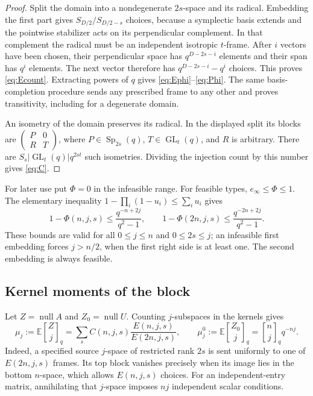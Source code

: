 \documentclass[11pt]{article}
\theoremstyle{definition}\newtheorem{definition}[theorem]{Definition}
\theoremstyle{remark}\newtheorem{remark}[theorem]{Remark}
\newcommand{\E}{\mathbb E}
\newcommand{\Sp}{\operatorname{Sp}}
\newcommand{\GL}{\operatorname{GL}}
\newcommand{\nul}{\operatorname{null}}
\newcommand{\gb}[2]{\genfrac{[}{]}{0pt}{}{#1}{#2}_{q}}
\newcommand{\1}{\mathbf 1}
\begin{document}
\begin{proof}
Split the domain into a nondegenerate $2s$-space and its radical. Embedding
the first part gives $S_{D/2}/S_{D/2-s}$ choices, because a symplectic
basis extends and the pointwise stabilizer acts on its perpendicular
complement. In that complement the radical must be an independent
isotropic $t$-frame. After $i$ vectors have been chosen, their perpendicular
space has $q^{D-2s-i}$ elements and their span has $q^i$ elements. The next
vector therefore has $q^{D-2s-i}-q^i$ choices. This proves
\eqref{eq:Ecount}. Extracting powers of $q$ gives \eqref{eq:Ephi}--\eqref{eq:Phi}.
The same basis-completion procedure sends any prescribed frame to any
other and proves transitivity, including for a degenerate domain.

An isometry of the domain preserves its radical. In the displayed split
its blocks are $\left(\begin{smallmatrix}P&0\\R&T\end{smallmatrix}\right)$,
where $P\in\Sp_{2s}(q)$, $T\in\GL_t(q)$, and $R$ is arbitrary.
There are $S_s|\GL_t(q)|q^{2st}$ such isometries. Dividing the injection
count by this number gives \eqref{eq:C}.
\end{proof}

For later use put $\Phi=0$ in the infeasible range. For feasible types,
$e_\infty\le\Phi\le1$. The elementary inequality
$1-\prod_i(1-u_i)\le\sum_i u_i$ gives
\begin{equation}\label{eq:phibound}
 1-\Phi(n,j,s)\le\frac{q^{-n+2j}}{q^2-1},\qquad
 1-\Phi(2n,j,s)\le\frac{q^{-2n+2j}}{q^2-1}.
\end{equation}
These bounds are valid for all $0\le j\le n$ and $0\le2s\le j$;
an infeasible first embedding forces $j>n/2$, when the first right side
is at least one. The second embedding is always feasible.

\subsection{Kernel moments of the block}
Let $Z=\nul A$ and $Z_0=\nul U$. Counting $j$-subspaces in the kernels gives
\begin{equation}\label{eq:blockmoments}
 \mu_j:=\E\gb Zj
  =\sum_s C(n,j,s)\frac{E(n,j,s)}{E(2n,j,s)},\qquad
 \mu_j^0:=\E\gb{Z_0}{j}=\gb nj q^{-nj}.
\end{equation}
Indeed, a specified source $j$-space of restricted rank $2s$ is sent
uniformly to one of $E(2n,j,s)$ frames. Its top block vanishes precisely
when its image lies in the bottom $n$-space, which allows $E(n,j,s)$ choices.
For an independent-entry matrix, annihilating that $j$-space imposes $nj$
independent scalar conditions.
\end{document}
